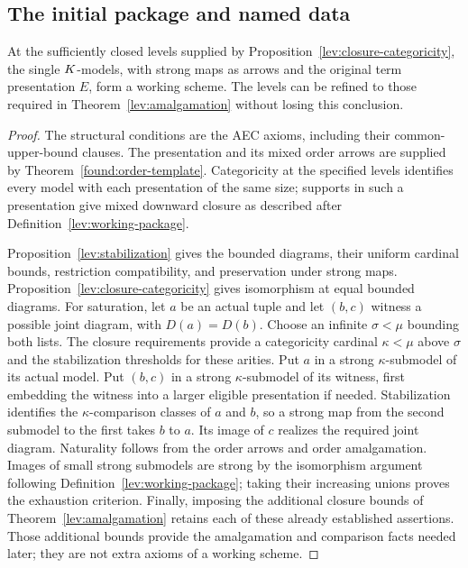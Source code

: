 \subsection{The initial package and named data}

\begin{proposition}
\label{lev:single-model-package}
At the sufficiently closed levels supplied by
Proposition~\ref{lev:closure-categoricity}, the single $K$-models,
with strong maps as arrows and the original term presentation $E$,
form a working scheme.  The levels can be refined to those required
in Theorem~\ref{lev:amalgamation} without losing this conclusion.
\end{proposition}

\begin{proof}
The structural conditions are the AEC axioms, including their
common-upper-bound clauses.  The presentation and its mixed order
arrows are supplied by Theorem~\ref{found:order-template}.
Categoricity at the specified levels identifies every model with
each presentation of the same size; supports in such a presentation
give mixed downward closure as described after
Definition~\ref{lev:working-package}.

Proposition~\ref{lev:stabilization} gives the bounded diagrams, their
uniform cardinal bounds, restriction compatibility, and preservation
under strong maps.  Proposition~\ref{lev:closure-categoricity} gives
isomorphism at equal bounded diagrams.  For saturation, let $a$ be
an actual tuple and let $(b,c)$ witness a possible joint diagram,
with $D(a)=D(b)$.  Choose an infinite $\sigma<\mu$ bounding both
lists.  The closure requirements provide a categoricity cardinal
$\kappa<\mu$ above $\sigma$ and the stabilization thresholds for
these arities.  Put $a$ in a strong $\kappa$-submodel of its actual
model.  Put $(b,c)$ in a strong $\kappa$-submodel of its witness,
first embedding the witness into a larger eligible presentation if
needed.  Stabilization identifies the $\kappa$-comparison classes
of $a$ and $b$, so a strong map from the second submodel to the
first takes $b$ to $a$.  Its image of $c$ realizes the required
joint diagram.  Naturality follows from the order
arrows and order amalgamation.  Images of small strong submodels are
strong by the isomorphism argument following
Definition~\ref{lev:working-package}; taking their increasing unions
proves the exhaustion criterion.  Finally, imposing the additional
closure bounds of Theorem~\ref{lev:amalgamation} retains each of
these already established assertions.  Those additional bounds
provide the amalgamation and comparison facts needed later; they
are not extra axioms of a working scheme.
\end{proof}

